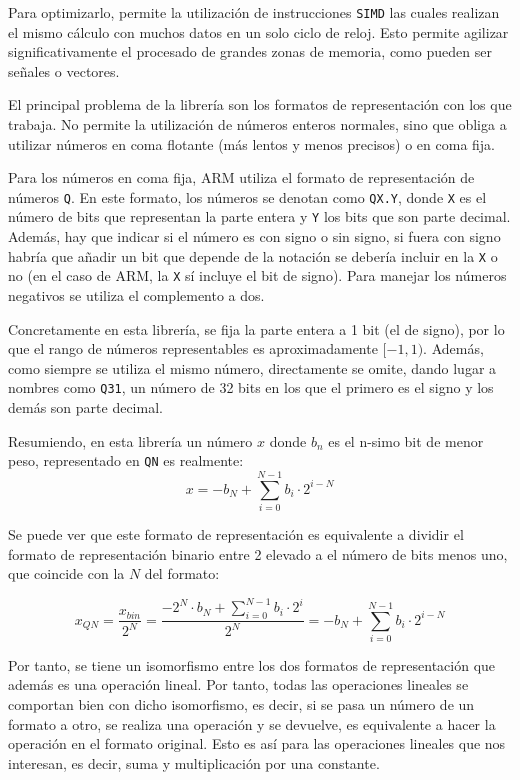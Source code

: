 Para optimizarlo, permite la utilización de instrucciones \texttt{SIMD} las cuales realizan el mismo cálculo con muchos datos en un solo ciclo de reloj. Esto permite agilizar significativamente el procesado de grandes zonas de memoria, como pueden ser señales o vectores.

El principal problema de la librería son los formatos de representación con los que trabaja. No permite la utilización de números enteros normales, sino que obliga a utilizar números en coma flotante (más lentos y menos precisos) o en coma fija.

Para los números en coma fija, ARM utiliza el formato de representación de números \texttt{Q}. En este formato, los números se denotan como \texttt{QX.Y}, donde \texttt{X} es el número de bits que representan la parte entera y \texttt{Y} los bits que son parte decimal. Además, hay que indicar si el número es con signo o sin signo, si fuera con signo habría que añadir un bit que depende de la notación se debería incluir en la \texttt{X} o no (en el caso de ARM, la \texttt{X} sí incluye el bit de signo). Para manejar los números negativos se utiliza el complemento a dos.\cite{NumberFormat}

Concretamente en esta librería, se fija la parte entera a 1 bit (el de signo), por lo que el rango de números representables es aproximadamente $[-1, 1)$. Además, como siempre se utiliza el mismo número, directamente se omite, dando lugar a nombres como \texttt{Q31}, un número de 32 bits en los que el primero es el signo y los demás son parte decimal. %

Resumiendo, en esta librería un número $x$ donde $b_n$ es el n-simo bit de menor peso, representado en \texttt{QN} es realmente:
\[ x = -b_{N} + \sum_{i = 0}^{N - 1} b_i\cdot 2^{i-N} \]

Se puede ver que este formato de representación es equivalente a dividir el formato de representación binario entre 2 elevado a el número de bits menos uno, que coincide con la $N$ del formato:

\[ x_{QN} = \frac{x_{bin}}{2^N} = \frac{-2^N\cdot b_N + \sum_{i=0}^{N - 1} b_i\cdot 2^i}{2^N} = -b_{N} + \sum_{i = 0}^{N - 1} b_i\cdot 2^{i-N} \]

Por tanto, se tiene un isomorfismo entre los dos formatos de representación que además es una operación lineal. Por tanto, todas las operaciones lineales se comportan bien con dicho isomorfismo, es decir, si se pasa un número de un formato a otro, se realiza una operación y se devuelve, es equivalente a hacer la operación en el formato original. Esto es así para las operaciones lineales que nos interesan, es decir, suma y multiplicación por una constante.

